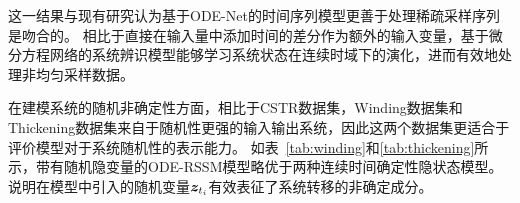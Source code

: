 这一结果与现有研究认为基于ODE-Net的时间序列模型更善于处理稀疏采样序列是吻合的\cite{Quaglino2019}。
相比于直接在输入量中添加时间的差分作为额外的输入变量，基于微分方程网络的系统辨识模型能够学习系统状态在连续时域下的演化，进而有效地处理非均匀采样数据。



在建模系统的随机非确定性方面，相比于CSTR数据集，Winding数据集和Thickening数据集来自于随机性更强的输入输出系统，因此这两个数据集更适合于评价模型对于系统随机性的表示能力。
如表~\ref{tab:winding}和\ref{tab:thickening}所示，带有随机隐变量的ODE-RSSM模型略优于两种连续时间确定性隐状态模型。
说明在模型中引入的随机变量$\boldsymbol{z}_{t_i}$有效表征了系统转移的非确定成分。

